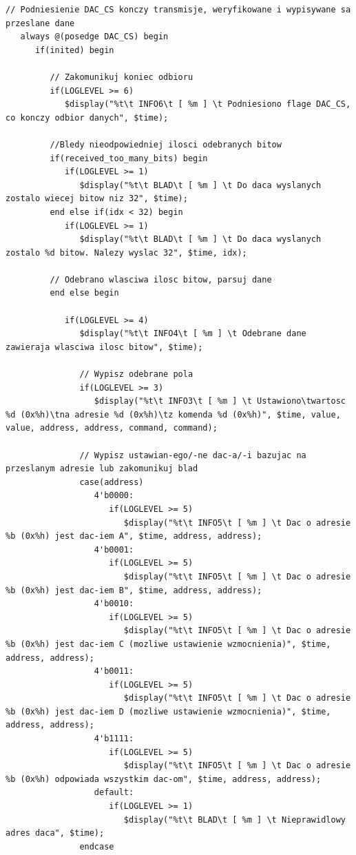 \documentclass[a4paper,12pt]{article}
\begin{document}
\begin{lstlisting}[label=DacLTC2624Behav,caption=DacLTC2624Behav.v,firstnumber=197]
   // Podniesienie DAC_CS konczy transmisje, weryfikowane i wypisywane sa przeslane dane
   always @(posedge DAC_CS) begin
      if(inited) begin

         // Zakomunikuj koniec odbioru
         if(LOGLEVEL >= 6)
            $display("%t\t INFO6\t [ %m ] \t Podniesiono flage DAC_CS, co konczy odbior danych", $time);

         //Bledy nieodpowiedniej ilosci odebranych bitow
         if(received_too_many_bits) begin
            if(LOGLEVEL >= 1)
               $display("%t\t BLAD\t [ %m ] \t Do daca wyslanych zostalo wiecej bitow niz 32", $time);
         end else if(idx < 32) begin
            if(LOGLEVEL >= 1)
               $display("%t\t BLAD\t [ %m ] \t Do daca wyslanych zostalo %d bitow. Nalezy wyslac 32", $time, idx);

         // Odebrano wlasciwa ilosc bitow, parsuj dane
         end else begin

            if(LOGLEVEL >= 4)
               $display("%t\t INFO4\t [ %m ] \t Odebrane dane zawieraja wlasciwa ilosc bitow", $time);

               // Wypisz odebrane pola
               if(LOGLEVEL >= 3)
                  $display("%t\t INFO3\t [ %m ] \t Ustawiono\twartosc %d (0x%h)\tna adresie %d (0x%h)\tz komenda %d (0x%h)", $time, value, value, address, address, command, command);

               // Wypisz ustawian-ego/-ne dac-a/-i bazujac na przeslanym adresie lub zakomunikuj blad
               case(address)
                  4'b0000:
                     if(LOGLEVEL >= 5)
                        $display("%t\t INFO5\t [ %m ] \t Dac o adresie %b (0x%h) jest dac-iem A", $time, address, address);
                  4'b0001:
                     if(LOGLEVEL >= 5)
                        $display("%t\t INFO5\t [ %m ] \t Dac o adresie %b (0x%h) jest dac-iem B", $time, address, address);
                  4'b0010:
                     if(LOGLEVEL >= 5)
                        $display("%t\t INFO5\t [ %m ] \t Dac o adresie %b (0x%h) jest dac-iem C (mozliwe ustawienie wzmocnienia)", $time, address, address);
                  4'b0011:
                     if(LOGLEVEL >= 5)
                        $display("%t\t INFO5\t [ %m ] \t Dac o adresie %b (0x%h) jest dac-iem D (mozliwe ustawienie wzmocnienia)", $time, address, address);
                  4'b1111:
                     if(LOGLEVEL >= 5)
                        $display("%t\t INFO5\t [ %m ] \t Dac o adresie %b (0x%h) odpowiada wszystkim dac-om", $time, address, address);
                  default:
                     if(LOGLEVEL >= 1)
                        $display("%t\t BLAD\t [ %m ] \t Nieprawidlowy adres daca", $time);
               endcase


\end{lstlisting}
\end{document}
